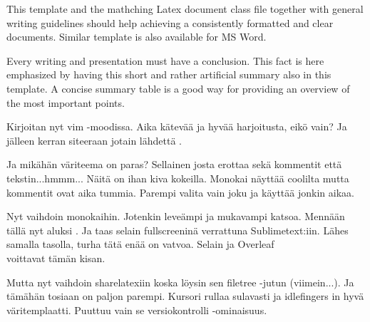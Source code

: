 \documentclass[12pt,a4paper,finnish]{tutthesis}
\begin{document}
This template and the mathching Latex document class file together
with general writing guidelines should help achieving a consistently
formatted and clear documents. Similar template is also available for
MS Word.

Every writing and presentation must have a conclusion. This fact is
here emphasized by having this short and rather artificial summary
also in this template. A concise summary table is a good way for
providing an overview of the most important points.

Kirjoitan nyt vim -moodissa. Aika kätevää ja hyvää harjoitusta, eikö vain?
Ja jälleen kerran siteeraan jotain lähdettä \parencite{rubberwheel}.

Ja mikähän väriteema on paras? Sellainen josta erottaa sekä kommentit että tekstin...hmmm...
Näitä on ihan kiva kokeilla. Monokai näyttää coolilta mutta kommentit ovat
aika tummia. Parempi valita vain joku ja käyttää jonkin aikaa.

Nyt vaihdoin monokaihin. Jotenkin leveämpi ja mukavampi katsoa. Mennään
tällä nyt aluksi \parencite{wang2010143}. Ja taas selain fullscreeninä verrattuna
Sublimetext:iin. Lähes samalla tasolla, turha tätä enää on vatvoa. Selain ja Overleaf \\ voittavat
tämän kisan.

Mutta nyt vaihdoin sharelatexiin koska löysin sen filetree -jutun (viimein...).
Ja tämähän tosiaan on paljon parempi. Kursori rullaa sulavasti ja idlefingers in hyvä
väritemplaatti. Puuttuu vain se versiokontrolli -ominaisuus.



\newpage

\renewcommand{\bibname}{Lähteet}         %


%
%

\end{document}
